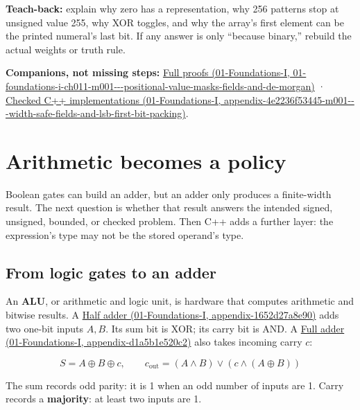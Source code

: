 \textbf{Teach-back:} explain why zero has a representation, why 256 patterns stop at unsigned value 255, why XOR toggles, and why the array's first element can be the printed numeral's last bit. If any answer is only ``because binary,'' rebuild the actual weights or truth rule.

\textbf{Companions, not missing steps:} \href{../01-Foundations-I/main.pdf\#nameddest=01-foundations-i-ch011-m001---positional-value-masks-fields-and-de-morgan}{Full proofs (01-Foundations-I, 01-foundations-i-ch011-m001-\/-\/-positional-value-masks-fields-and-de-morgan)} · \href{../01-Foundations-I/main.pdf\#nameddest=appendix-4e2236f53445-m001---width-safe-fields-and-lsb-first-bit-packing}{Checked C++ implementations (01-Foundations-I, appendix-4e2236f53445-m001-\/-\/-width-safe-fields-and-lsb-first-bit-packing)}.

\section{Arithmetic becomes a policy}\label{05-engine-i-ch001-arithmetic-becomes-a-policy}

Boolean gates can build an adder, but an adder only produces a finite-width result. The next question is whether that result answers the intended signed, unsigned, bounded, or checked problem. Then C++ adds a further layer: the expression's type may not be the stored operand's type.

\subsection{From logic gates to an adder}\label{05-engine-i-ch001-from-logic-gates-to-an-adder}

An \textbf{ALU}, or arithmetic and logic unit, is hardware that computes arithmetic and bitwise results. A \href{../01-Foundations-I/main.pdf\#nameddest=appendix-1652d27a8e90}{Half adder (01-Foundations-I, appendix-1652d27a8e90)} adds two one-bit inputs \(A,B\). Its sum bit is XOR; its carry bit is AND. A \href{../01-Foundations-I/main.pdf\#nameddest=appendix-d1a5b1e520c2}{Full adder (01-Foundations-I, appendix-d1a5b1e520c2)} also takes incoming carry \(c\):

\[
S=A\oplus B\oplus c,\qquad
c_{\mathrm{out}}=(A\land B)\lor(c\land(A\oplus B))
\]

The sum records odd parity: it is 1 when an odd number of inputs are 1. Carry records a \textbf{majority}: at least two inputs are 1.

